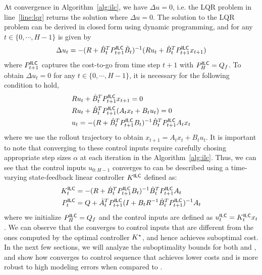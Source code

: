 At convergence in Algorithm~\ref{alg:ilc}, we have $\Delta u = 0$,
i.e. the LQR problem in line~\ref{line:lqr} returns the solution where
$\Delta u = 0$. The solution to the LQR problem can be derived in
closed form using dynamic programming, and for any $t \in \{0, \cdots,
H-1\}$ is given by
\begin{align*}
  \Delta u_t = -(R + \hat{B}_t^TP^\mathsf{ILC}_{t+1}\hat{B}_t)^{-1}(Ru_t + \hat{B}_t^TP^\mathsf{ILC}_{t+1}x_{t+1})
\end{align*}
where $P^\mathsf{ILC}_{t+1}$ captures the cost-to-go from time step $t+1$ with
$P^\mathsf{ILC}_H = Q_f$. To obtain $\Delta u_t = 0$ for any $t \in \{0, \cdots, H-1\}$,
it is necessary for the following condition to hold,
\begin{align*}
  &Ru_{t} + \hat{B}^{T}_{t}P^\mathsf{ILC}_{t+1}x_{t+1} = 0 \\
  &Ru_{t} + \hat{B}^{T}_{t}P^\mathsf{ILC}_{t+1}(A_{t}x_{t} + B_{t}u_{t}) = 0 \\
  &u_{t} = -(R + \hat{B}_{t}^{T}P^\mathsf{ILC}_{t+1}B_{t})^{-1}\hat{B}_{t}^{T}P^\mathsf{ILC}_{t+1}A_{t}x_{t}
\end{align*}
where we use the rollout trajectory to obtain
$x_{t+1} = A_{t}x_{t} + B_{t}u_{t}$. It is important to note that converging to
these control inputs require carefully chosing appropriate step sizes $\alpha$ at each
iteration in the \ILC{} Algorithm~\ref{alg:ilc}. Thus, we can see that
the control inputs $u_{0:H-1}$
\ILC{} converges to can be described using a time-varying state-feedback linear
controller $K^\mathsf{ILC}$ defined as:
\begin{align*}
  K^\mathsf{ILC}_{t} &= -(R + \hat{B}_{t}^{T}P^\mathsf{ILC}_{t+1}B_{t})^{-1}\hat{B}_{t}^{T}P^\mathsf{ILC}_{t+1}A_{t} \\
  P^\mathsf{ILC}_{t} &=  Q + \hat{A}_{t}^{T}P^\mathsf{ILC}_{t+1}(I + B_{t}R^{-1}\hat{B}_{t}^{T}P^\mathsf{ILC}_{t+1})^{-1}A_{t}
\end{align*}
where we initialize $P^\mathsf{ILC}_{H} = Q_{f}$ and the control inputs are defined as
$u^{\mathsf{ILC}}_{t} = K^\mathsf{ILC}_{t}x_{t}$. We can observe that the \ILC{} converges
to control inputs that are different from the ones computed by the optimal
controller $K^\star$, and hence achieves suboptimal cost. In the next few sections, we
will analyze the suboptimality bounds for both \MM{} and \ILC{}, and show how \ILC{}
converges to control sequence that achieves lower costs and is more robust to
high modeling errors when compared to \MM{}.

